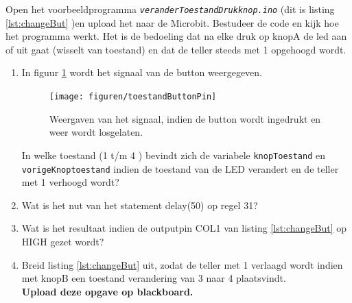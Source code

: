 Open het voorbeeldprogramma \texttt{\textit{veranderToestandDrukknop.ino}} (dit is listing \ref{lst:changeBut} )en upload het naar de Microbit.
Bestudeer de code en kijk hoe het programma werkt. Het is de bedoeling dat na elke druk op knopA de led aan of uit gaat (wisselt van toestand) en dat de teller steeds met 1 opgehoogd wordt. 
	\begin{enumerate}[label=(\Alph*)]

	\item In figuur \ref{fig:swToestand} wordt het signaal van de button weergegeven.
\begin{figure}[h!]
	\captionsetup{justification=centering}
	\texttt{[image: figuren/toestandButtonPin]}
	\centering
	\caption{Weergaven van het signaal, indien de button wordt ingedrukt en weer wordt losgelaten.}
	\label{fig:swToestand}
\end{figure}
In welke toestand (1 t/m 4 )  bevindt zich de variabele \texttt{knopToestand} en \texttt{vorigeKnoptoestand} indien de toestand van de LED verandert en de teller met 1 verhoogd wordt?
\item Wat is het nut van het statement \textcolor{arduinoOrange}{delay}(50) op regel 31?\hrulefill
\item Wat is het resultaat indien de outputpin COL1 van listing \ref{lst:changeBut} op \textcolor{arduinoBlue}{HIGH} gezet wordt?	
\item Breid listing \ref{lst:changeBut} uit, zodat de teller met 1 verlaagd wordt indien met knopB een toestand verandering van 3 naar 4 plaatsvindt.\\
\textbf{Upload deze opgave op blackboard.}
	
\end{enumerate}


